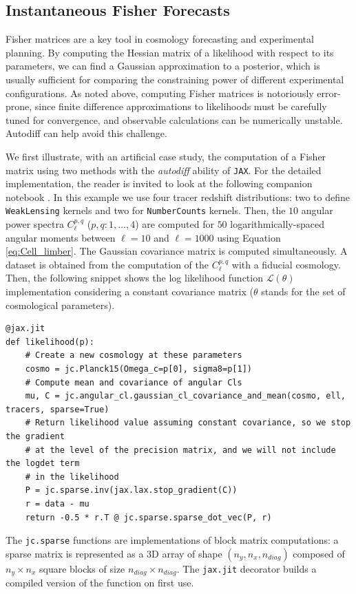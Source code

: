 \documentclass[twocolumn,twocolappendix,nofootinbib,iop]{openjournal}
\newcommand{\nblink}[1]{\href{https://github.com/DifferentiableUniverseInitiative/jax-cosmo-paper/blob/master/notebooks/#1.ipynb}{\faFileCodeO}}
\newcommand{\jax}{\texttt{JAX}}
\begin{document}
\subsection{Instantaneous Fisher Forecasts}
Fisher matrices are a key tool in cosmology forecasting and experimental planning. By computing the Hessian matrix of a likelihood with respect to its parameters, we can find a Gaussian approximation to a posterior, which is usually sufficient for comparing the constraining power of different experimental configurations. As noted above, computing Fisher matrices is notoriously error-prone, since finite difference approximations to likelihoods must be carefully tuned for convergence, and observable calculations can be numerically unstable. Autodiff can help avoid this challenge.

We first illustrate, with an artificial case study, the computation of a Fisher matrix using two methods with the \textit{autodiff} ability of \jax. For the detailed implementation, the reader is invited to look at the following companion notebook \nblink{Simple-Fisher}. In this example we use four tracer redshift distributions: two to define \texttt{WeakLensing} kernels and two for \texttt{NumberCounts} kernels. Then, the $10$ angular power spectra $C_\ell^{p,q}$ ($p,q:1,\dots,4$) are computed for $50$  logarithmically-spaced angular moments between $\ell=10$ and $\ell=1000$ using Equation \ref{eq:Cell_limber}. The Gaussian covariance matrix is computed simultaneously. A dataset is obtained from the computation of the $C_\ell^{p,q}$ with a fiducial cosmology. Then, the following snippet shows the log likelihood function $\mathcal{L}(\theta)$ implementation considering a constant covariance matrix ($\theta$ stands for the set of cosmological parameters). 
\begin{lstlisting}[language=iPython]
@jax.jit
def likelihood(p):
    # Create a new cosmology at these parameters
    cosmo = jc.Planck15(Omega_c=p[0], sigma8=p[1])
    # Compute mean and covariance of angular Cls
    mu, C = jc.angular_cl.gaussian_cl_covariance_and_mean(cosmo, ell, tracers, sparse=True)
    # Return likelihood value assuming constant covariance, so we stop the gradient
    # at the level of the precision matrix, and we will not include the logdet term
    # in the likelihood
    P = jc.sparse.inv(jax.lax.stop_gradient(C))
    r = data - mu
    return -0.5 * r.T @ jc.sparse.sparse_dot_vec(P, r)
\end{lstlisting}
The \texttt{jc.sparse} functions are implementations of block matrix computations: a sparse matrix is represented as a 3D array of shape $(n_y, n_x, n_{diag})$ composed of $n_y \times n_x$ square blocks of size $n_{diag} \times n_{diag}$.  The \texttt{jax.jit} decorator builds a compiled version of the function on first use. 
\end{document}
